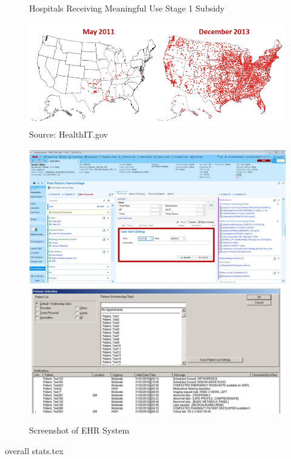 \documentclass[11pt]{article}
\begin{document}
\begin{figure}[htp]
    \centering
    \caption{Hospitals Receiving Meaningful Use Stage 1 Subsidy}
    \includegraphics[scale=.6]{Objects/QS-Hospitals-Receiving-Payments-for-MU-and-Adoption.png}
    \caption*{Source: HealthIT.gov}
    \label{fig:meanuse}
\end{figure}

\begin{figure}[htp]
    \centering
    \caption{Screenshot of EHR System}
    \includegraphics[scale=.5]{Objects/epic-ehr-screenshot.jpg}
    \includegraphics[scale=.135]{Objects/EHRimage2.jpg}
    \label{fig:EPIC}
\end{figure}

{overall stats.tex}
\end{document}
